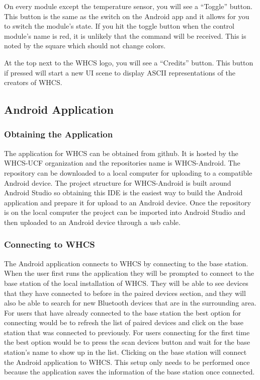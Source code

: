 On every module except the temperature sensor, you will see a ``Toggle'' button. This button
is the same as the switch on the Android app and it allows for you to switch the module's
state. If you hit the toggle button when the control module's name is red, it is unlikely
that the command will be received. This is noted by the square which should not
change colors.

At the top next to the WHCS logo, you will see a ``Credits'' button. This button if pressed
will start a new UI scene to display ASCII representations of the creators of WHCS.

\subsection{Android Application}
\subsubsection{Obtaining the Application}

The application for WHCS can be obtained from github. It is hosted by the
WHCS-UCF organization and the repositories name is WHCS-Android. The repository
can be downloaded to a local computer for uploading to a compatible Android
device. The project structure for WHCS-Android is built around Android Studio
so obtaining this IDE is the easiest way to build the Android application and
prepare it for upload to an Android device. Once the repository is on the local
computer the project can be imported into Android Studio and then uploaded to
an Android device through a usb cable.

\subsubsection{Connecting to WHCS}

The Android application connects to WHCS by connecting to the base station. When the user first runs the application they will be prompted to connect to the base station of the local installation of WHCS. They will be able to see devices that they have connected to before in the paired devices section, and they will also be able to search for new Bluetooth devices that are in the surrounding area. For users that have already connected to the base station the best option for connecting would be to refresh the list of paired devices and click on the base station that was connected to previously. For users connecting for the first time the best option would be to press the scan devices button and wait for the base station’s name to show up in the list. Clicking on the base station will connect the Android application to WHCS. This setup only needs to be performed once because the application saves the information of the base station once connected.

